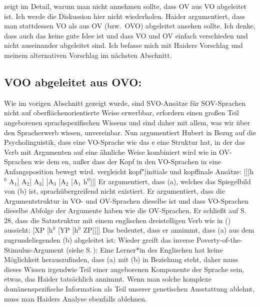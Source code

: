 \citet{Haider2000a} zeigt im Detail, warum man nicht annehmen sollte, dass OV aus VO abgeleitet ist. Ich werde die
Diskussion hier nicht wiederholen. Haider argumentiert, dass man stattdessen VO als aus OV (bzw.\
OVO) abgeleitet ansehen sollte. Ich denke,
dass auch das keine gute Idee ist und dass VO und OV einfach verschieden und nicht auseinander
abgeleitet sind. Ich befasse mich mit Haiders Vorschlag und meinem alternativen Vorschlag im nächsten Abschnitt.

\subsection{VOO abgeleitet aus OVO: \citet{Haider2020a}}
\label{sec-vo-derived-from-ov}

Wie im vorigen Abschnitt gezeigt wurde, sind SVO-Ansätze für SOV-Sprachen nicht auf
oberflächenorientierte Weise erwerbbar, erfordern einen großen Teil angeborenen sprachspezifischen Wissens und sind daher
mit allem, was wir über den Spracherwerb wissen, unvereinbar. Nun argumentiert Hubert
\citet{Haider2000a,Haider2010a,Haider2020a} in Bezug auf die Psycholinguistik, dass eine VO-Sprache wie das
\ili{Englisch}e eine Struktur hat, in der das Verb mit Argumenten auf eine ähnliche Weise kombiniert wird wie in OV-Sprachen
wie dem \ili{Deutsch}en, außer dass der Kopf in den VO-Sprachen in eine Anfangsposition bewegt wird.
\citet[\page 15]{Haider2010a} vergleicht kopf"|initiale und kopffinale Ansätze:
\eal
\ex {}[[[h$^0$ A$_1$] A$_2$] A$_3$]
\ex {}[A$_3$ [A$_2$ [A$_1$ h$^0$]]]
\zl
Er argumentiert, dass (a), welches das Spiegelbild von (b) ist, sprachübergreifend nicht existiert. Er argumentiert, dass die Argumentstruktur
in VO- und OV-Sprachen dieselbe ist und dass VO-Sprachen dieselbe Abfolge der Argumente haben wie die OV-Sprachen.
Er schließt auf S.\,28, dass die Satzstruktur mit einem englischen\il{Englisch} dreistelligen Verb wie in (\mex{1}) aussieht:
\ea
\label{ex-Haider-English-head-movmenet}
{}[XP [h$^0$ [YP [h$^0$ ZP]]]]
\z
Das bedeutet, dass er annimmt, dass (a) aus dem zugrundeliegenden (b) abgeleitet ist:
\eal
{}
\zl
Wieder greift das inverse Poverty-of-the-Stimulus-Argument (siehe S.\,\pageref{pos-argument}): Eine Lerner*in des
Englischen hat keine Möglichkeit herauszufinden, dass (\mex{0}a) mit (\mex{0}b) in Beziehung steht, daher muss dieses Wissen
irgendwie Teil einer angeborenen Komponente der Sprache sein, etwas, das Haider tatsächlich annimmt. Wenn man
solche komplexe domänenspezifische Information als Teil unserer genetischen Ausstattung ablehnt,
muss man Haiders Analyse ebenfalls ablehnen.

